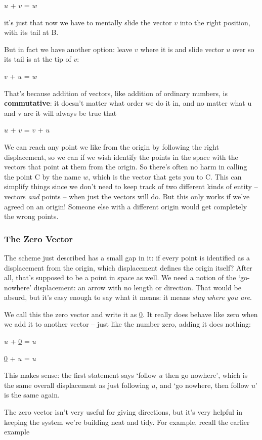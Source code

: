 \documentclass[oneside,english]{amsbook}
\numberwithin{section}{chapter}
\theoremstyle{plain}
\theoremstyle{definition}
\begin{document}
$u$ + $v$ = $w$

it's just that now we have to mentally slide the vector $v$ into the
right position, with its tail at B.

But in fact we have another option: leave $v$ where it is and slide
vector $u$ over so its tail is at the tip of $v$:

$v$ + $u$ = $w$

That's because addition of vectors, like addition of ordinary numbers,
is \textbf{commutative}: it doesn't matter what order we do it in, and
no matter what u and v are it will always be true that

$u$ + $v$ = $v$ + $u$

We can reach any point we like from the origin by following the right
displacement, so we can if we wish identify the points in the space with
the vectors that point at them from the origin. So there's often no harm
in calling the point C by the name $w$, which is the vector that gets
you to C. This can simplify things since we don't need to keep track of
two different kinds of entity -- vectors \emph{and} points -- when just
the vectors will do. But this only works if we've agreed on an origin!
Someone else with a different origin would get completely the wrong
points.

\subsubsection{The Zero Vector}

The scheme just described has a small gap in it: if every point is
identified as a displacement from the origin, which displacement defines
the origin itself? After all, that's supposed to be a point in space as
well. We need a notion of the `go-nowhere' displacement: an arrow with
no length or direction. That would be absurd, but it's easy enough to
say what it means: it means \emph{stay where you are}.

We call this the zero vector and write it as \ul{0}. It really does
behave like zero when we add it to another vector -- just like the
number zero, adding it does nothing:

$u$ + \ul{0} = $u$

\ul{0} + $u$ = $u$

This makes sense: the first statement says `follow $u$ then go
nowhere', which is the same overall displacement as just following
$u$, and `go nowhere, then follow $u$' is the same again.

The zero vector isn't very useful for giving directions, but it's very
helpful in keeping the system we're building neat and tidy. For example,
recall the earlier example
\end{document}
